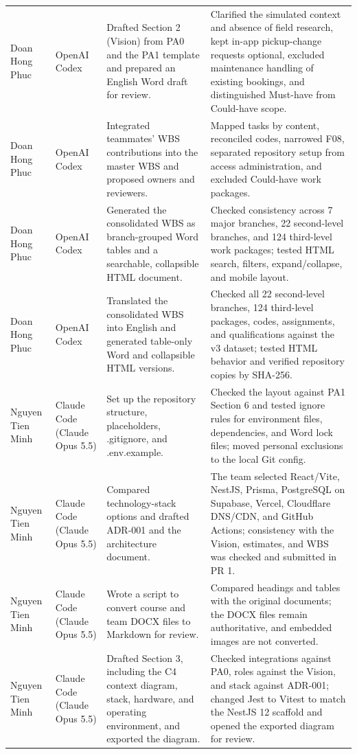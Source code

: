 \documentclass[11pt]{article}
\begin{document}
\begin{longtable}{@{}L{2.8cm}L{2.0cm}L{5.0cm}L{5.8cm}@{}}
Doan Hong Phuc & OpenAI Codex & Drafted Section 2 (Vision) from PA0 and the PA1 template and prepared an English Word draft for review. & Clarified the simulated context and absence of field research, kept in-app pickup-change requests optional, excluded maintenance handling of existing bookings, and distinguished Must-have from Could-have scope. \\
Doan Hong Phuc & OpenAI Codex & Integrated teammates' WBS contributions into the master WBS and proposed owners and reviewers. & Mapped tasks by content, reconciled codes, narrowed F08, separated repository setup from access administration, and excluded Could-have work packages. \\
Doan Hong Phuc & OpenAI Codex & Generated the consolidated WBS as branch-grouped Word tables and a searchable, collapsible HTML document. & Checked consistency across 7 major branches, 22 second-level branches, and 124 third-level work packages; tested HTML search, filters, expand/collapse, and mobile layout. \\
Doan Hong Phuc & OpenAI Codex & Translated the consolidated WBS into English and generated table-only Word and collapsible HTML versions. & Checked all 22 second-level branches, 124 third-level packages, codes, assignments, and qualifications against the v3 dataset; tested HTML behavior and verified repository copies by SHA-256. \\
Nguyen Tien Minh & Claude Code (Claude Opus 5.5) & Set up the repository structure, placeholders, .gitignore, and .env.example. & Checked the layout against PA1 Section 6 and tested ignore rules for environment files, dependencies, and Word lock files; moved personal exclusions to the local Git config. \\
Nguyen Tien Minh & Claude Code (Claude Opus 5.5) & Compared technology-stack options and drafted ADR-001 and the architecture document. & The team selected React/Vite, NestJS, Prisma, PostgreSQL on Supabase, Vercel, Cloudflare DNS/CDN, and GitHub Actions; consistency with the Vision, estimates, and WBS was checked and submitted in PR 1. \\
Nguyen Tien Minh & Claude Code (Claude Opus 5.5) & Wrote a script to convert course and team DOCX files to Markdown for review. & Compared headings and tables with the original documents; the DOCX files remain authoritative, and embedded images are not converted. \\
Nguyen Tien Minh & Claude Code (Claude Opus 5.5) & Drafted Section 3, including the C4 context diagram, stack, hardware, and operating environment, and exported the diagram. & Checked integrations against PA0, roles against the Vision, and stack against ADR-001; changed Jest to Vitest to match the NestJS 12 scaffold and opened the exported diagram for review. \\

\end{longtable}
\end{document}
